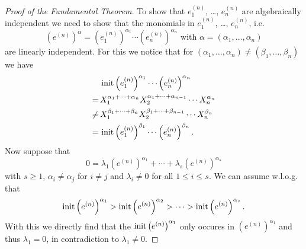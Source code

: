 \begin{proof}[Proof of the Fundamental Theorem]
 To show that $e^{(n)}_1$, \dots, $e^{(n)}_n$ are algebraically independent we need to show that the monomials in $e^{(n)}_1$, \dots, $e^{(n)}_n$, i.e.
 \[
  \left(e^{(n)}\right)^\alpha = \left(e^{(n)}_1\right)^{\alpha_1} \dotsm \left(e^{(n)}_n\right)^{\alpha_n} \text{ with } \alpha = (\alpha_1, \dotsc, \alpha_n)
 \]
 are linearly independent. For this we notice that for $(\alpha_1, \dotsc, \alpha_n) \neq (\beta_1, \dotsc, \beta_n)$ we have
 \begin{align*}
      &\, \operatorname{init} \left(e^{(n)}_1\right)^{\alpha_1} \dotsm \left(e^{(n)}_n\right)^{\alpha_n} \\
     =&\, X_1^{\alpha_1 + \dotsb + \alpha_n} X_2^{\alpha_1 + \dotsb + \alpha_{n-1}} \dotsm X_n^{\alpha_n} \\
  \neq&\, X_1^{\beta_1 + \dotsb + \beta_n} X_2^{\beta_1 + \dotsb + \beta_{n-1}} \dotsm X_n^{\beta_n} \\
     =&\, \operatorname{init} \left(e^{(n)}_1\right)^{\beta_1} \dotsm \left(e^{(n)}_n\right)^{\beta_n}.
 \end{align*}
 Now suppose that
 \[
  0 = \lambda_1 \left(e^{(n)}\right)^{\alpha_1} + \dotsb + \lambda_s \left(e^{(n)}\right)^{\alpha_s}
 \]
 with $s \geq 1$, $\alpha_i \neq \alpha_j$ for $i \neq j$ and $\lambda_i \neq 0$ for all $1 \leq i \leq s$. We can assume w.l.o.g. that 
 \[
  \operatorname{init} \left(e^{(n)}\right)^{\alpha_1} > \operatorname{init} \left(e^{(n)}\right)^{\alpha_2} > \dotsb > \operatorname{init} \left(e^{(n)}\right)^{\alpha_s}.
 \]
 With this we directly find that the $\operatorname{init} \left(e^{(n)}\right)^{\alpha_1}$ only occures in $\left(e^{(n)}\right)^{\alpha_1}$ and thus $\lambda_1 = 0$, in contradiction to $\lambda_1 \neq 0$.
\end{proof}



